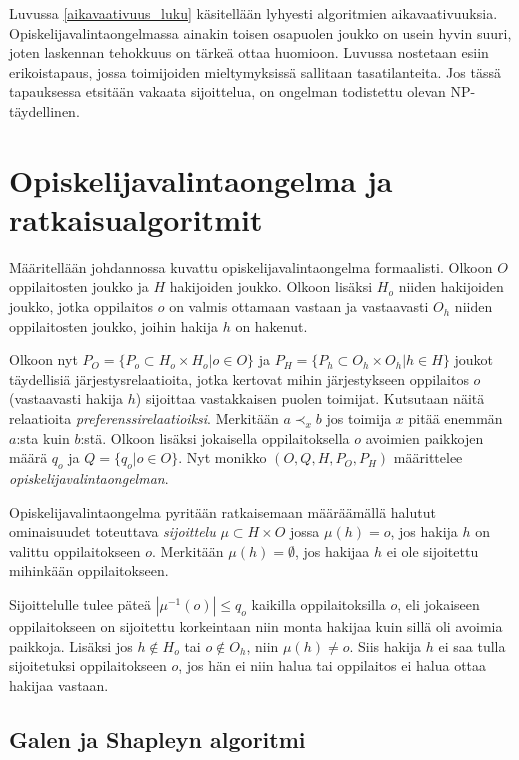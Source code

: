 \documentclass[twoside]{tktltiki}
\begin{document}
Luvussa \ref{aikavaativuus_luku} käsitellään lyhyesti algoritmien
aikavaativuuksia. Opiskelijavalintaongelmassa ainakin toisen osapuolen
joukko on usein hyvin suuri, joten laskennan tehokkuus on tärkeä ottaa
huomioon. Luvussa nostetaan esiin erikoistapaus, jossa toimijoiden
mieltymyksissä sallitaan tasatilanteita. Jos tässä tapauksessa
etsitään vakaata sijoittelua, on ongelman todistettu olevan
NP-täydellinen.
\newpage

\section{Opiskelijavalintaongelma ja ratkaisualgoritmit}
\label{algoritmit_luku}

Määritellään johdannossa kuvattu opiskelijavalintaongelma formaalisti.
Olkoon $O$ oppilaitosten joukko ja $H$ hakijoiden joukko. Olkoon
lisäksi $H_o$ niiden hakijoiden joukko, jotka oppilaitos $o$ on valmis
ottamaan vastaan ja vastaavasti $O_h$ niiden oppilaitosten joukko,
joihin hakija $h$ on hakenut.

Olkoon nyt $P_O = \{P_o \subset H_o \times H_o | o \in O\}$ ja $P_H =
\{P_h \subset O_h \times O_h | h \in H\}$ joukot täydellisiä
järjestysrelaatioita, jotka kertovat mihin järjestykseen oppilaitos
$o$ (vastaavasti hakija $h$) sijoittaa vastakkaisen puolen toimijat.
Kutsutaan näitä relaatioita \emph{preferenssirelaatioiksi}. Merkitään
$a \prec_x b$ jos toimija $x$ pitää enemmän $a$:sta kuin $b$:stä.
Olkoon lisäksi jokaisella oppilaitoksella $o$ avoimien paikkojen määrä
$q_o$ ja $Q = \{q_o | o \in O\}$. Nyt monikko $(O, Q, H, P_O, P_H)$
määrittelee \emph{opiskelijavalintaongelman}.

Opiskelijavalintaongelma pyritään ratkaisemaan määräämällä halutut
ominaisuudet toteuttava \emph{sijoittelu} $\mu \subset H \times O$
jossa $\mu(h) = o$, jos hakija $h$ on valittu oppilaitokseen $o$.
Merkitään $\mu(h) = \emptyset$, jos hakijaa $h$ ei ole sijoitettu
mihinkään oppilaitokseen.

Sijoittelulle tulee päteä $|\mu^{-1}(o)| \leq q_o$ kaikilla
oppilaitoksilla $o$, eli jokaiseen oppilaitokseen on sijoitettu
korkeintaan niin monta hakijaa kuin sillä oli avoimia paikkoja.
Lisäksi jos $h \notin H_o$ tai $o \notin O_h$, niin $\mu(h) \neq o$.
Siis hakija $h$ ei saa tulla sijoitetuksi oppilaitokseen $o$, jos hän
ei niin halua tai oppilaitos ei halua ottaa hakijaa vastaan.

\subsection{Galen ja Shapleyn algoritmi}
\end{document}

